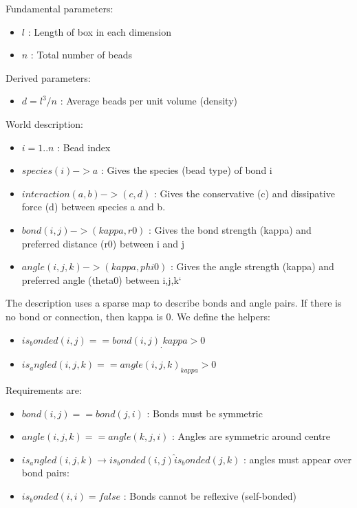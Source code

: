 \documentclass{article}
\begin{document}
Fundamental parameters:
\begin{itemize}
\item $l$ : Length of box in each dimension
\item $n$ : Total number of beads
\end{itemize}

Derived parameters:
\begin{itemize}
\item $d = l^3 / n$ : Average beads per unit volume (density)
\end{itemize}

World description:
\begin{itemize}
\item $i=1..n$ : Bead index
\item $species(i) -> a$ : Gives the species (bead type) of bond i 
\item $interaction(a,b) -> (c,d)$ : Gives the conservative (c) and dissipative force (d) between species a and b.
\item $bond(i,j) -> (kappa,r0)$ : Gives the bond strength (kappa) and preferred distance (r0) between i and j
\item $angle(i,j,k) -> (kappa,phi0)$ : Gives the angle strength (kappa) and preferred angle (theta0) between i,j,k`
\end{itemize}

The description uses a sparse map to describe bonds and angle pairs. If there
is no bond or connection, then kappa is 0. We define the helpers:
\begin{itemize}
\item $is_bonded(i,j) == bond(i,j)_.{kappa} > 0$
\item $is_angled(i,j,k) == angle(i,j,k)_{kappa} > 0$
\end{itemize}

Requirements are:
\begin{itemize}
\item $bond(i,j) == bond(j,i)$ : Bonds must be symmetric
\item $angle(i,j,k) == angle(k,j,i)$ : Angles are symmetric around centre
\item $is_angled(i,j,k) \rightarrow is_bonded(i,j) \hat  is_bonded(j,k)$ : angles must appear over bond pairs:
\item $is_bonded(i,i) = false$ : Bonds cannot be reflexive (self-bonded)
\end{itemize}
\end{document}
